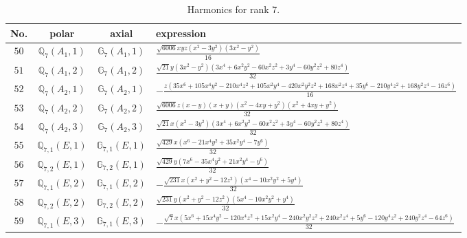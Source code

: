 \documentclass[fleqn,8pt,landscape]{jsarticle}
\begin{document}
\begin{table}[ht!]
\begin{center}
\caption{Harmonics for rank 7.}
\renewcommand{\arraystretch}{1.3}
\begin{tabular}{cccl} \hline \hline
No. & polar & axial & expression \\ \hline
$ 50 $ & $ \mathbb{Q}_{7}(A_{1},1) $ & $ \mathbb{G}_{7}(A_{1},1) $ & $ \frac{\sqrt{6006} x y z \left(x^{2} - 3 y^{2}\right) \left(3 x^{2} - y^{2}\right)}{16} $ \\
$ 51 $ & $ \mathbb{Q}_{7}(A_{1},2) $ & $ \mathbb{G}_{7}(A_{1},2) $ & $ \frac{\sqrt{21} y \left(3 x^{2} - y^{2}\right) \left(3 x^{4} + 6 x^{2} y^{2} - 60 x^{2} z^{2} + 3 y^{4} - 60 y^{2} z^{2} + 80 z^{4}\right)}{32} $ \\
$ 52 $ & $ \mathbb{Q}_{7}(A_{2},1) $ & $ \mathbb{G}_{7}(A_{2},1) $ & $ - \frac{z \left(35 x^{6} + 105 x^{4} y^{2} - 210 x^{4} z^{2} + 105 x^{2} y^{4} - 420 x^{2} y^{2} z^{2} + 168 x^{2} z^{4} + 35 y^{6} - 210 y^{4} z^{2} + 168 y^{2} z^{4} - 16 z^{6}\right)}{16} $ \\
$ 53 $ & $ \mathbb{Q}_{7}(A_{2},2) $ & $ \mathbb{G}_{7}(A_{2},2) $ & $ \frac{\sqrt{6006} z \left(x - y\right) \left(x + y\right) \left(x^{2} - 4 x y + y^{2}\right) \left(x^{2} + 4 x y + y^{2}\right)}{32} $ \\
$ 54 $ & $ \mathbb{Q}_{7}(A_{2},3) $ & $ \mathbb{G}_{7}(A_{2},3) $ & $ \frac{\sqrt{21} x \left(x^{2} - 3 y^{2}\right) \left(3 x^{4} + 6 x^{2} y^{2} - 60 x^{2} z^{2} + 3 y^{4} - 60 y^{2} z^{2} + 80 z^{4}\right)}{32} $ \\
$ 55 $ & $ \mathbb{Q}_{7,1}(E,1) $ & $ \mathbb{G}_{7,1}(E,1) $ & $ \frac{\sqrt{429} x \left(x^{6} - 21 x^{4} y^{2} + 35 x^{2} y^{4} - 7 y^{6}\right)}{32} $ \\
$ 56 $ & $ \mathbb{Q}_{7,2}(E,1) $ & $ \mathbb{G}_{7,2}(E,1) $ & $ \frac{\sqrt{429} y \left(7 x^{6} - 35 x^{4} y^{2} + 21 x^{2} y^{4} - y^{6}\right)}{32} $ \\
$ 57 $ & $ \mathbb{Q}_{7,1}(E,2) $ & $ \mathbb{G}_{7,1}(E,2) $ & $ - \frac{\sqrt{231} x \left(x^{2} + y^{2} - 12 z^{2}\right) \left(x^{4} - 10 x^{2} y^{2} + 5 y^{4}\right)}{32} $ \\
$ 58 $ & $ \mathbb{Q}_{7,2}(E,2) $ & $ \mathbb{G}_{7,2}(E,2) $ & $ \frac{\sqrt{231} y \left(x^{2} + y^{2} - 12 z^{2}\right) \left(5 x^{4} - 10 x^{2} y^{2} + y^{4}\right)}{32} $ \\
$ 59 $ & $ \mathbb{Q}_{7,1}(E,3) $ & $ \mathbb{G}_{7,1}(E,3) $ & $ - \frac{\sqrt{7} x \left(5 x^{6} + 15 x^{4} y^{2} - 120 x^{4} z^{2} + 15 x^{2} y^{4} - 240 x^{2} y^{2} z^{2} + 240 x^{2} z^{4} + 5 y^{6} - 120 y^{4} z^{2} + 240 y^{2} z^{4} - 64 z^{6}\right)}{32} $ \\

\end{tabular}
\end{center}
\end{table}
\end{document}
